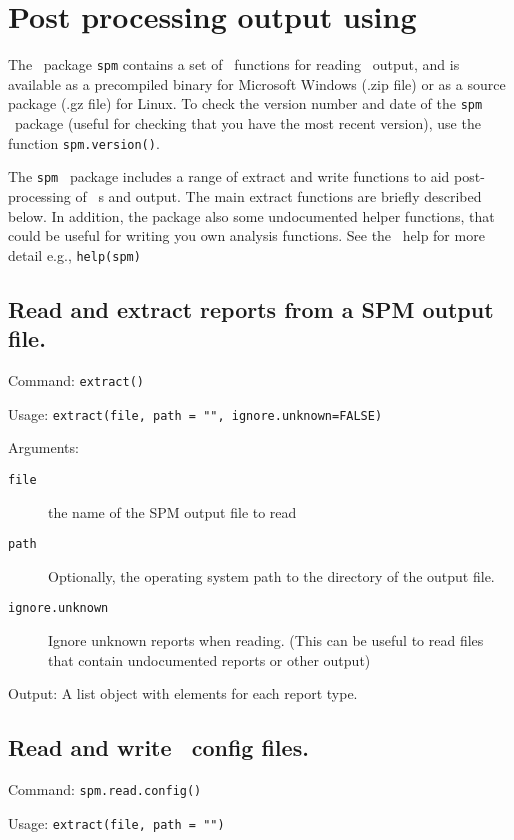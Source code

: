 \section{Post processing output using \R \label{sec:post-processing}}

The \R\ package \texttt{spm} contains a set of \R\ functions for reading \SPM\ output, and is available as a precompiled binary for Microsoft Windows (.zip file) or as a source package (.gz file) for Linux. To check the version number and date of the \texttt{spm} \R\ package (useful for checking that you have the most recent version), use the function \texttt{spm.version()}.

The \texttt{spm} \R\ package includes a range of extract and write functions to aid post-processing of \SPM\ \config s and output. The main extract functions are briefly described below. In addition, the package also some undocumented helper functions, that could be useful for writing you own analysis functions. See the \R\ help for more detail e.g., \texttt{help(spm)}

\subsection{Read and extract reports from a SPM output file.}

Command: \texttt{extract()} 

Usage: \texttt{extract(file, path = "", ignore.unknown=FALSE)}

Arguments:
\begin{description}
\item[\texttt{file}] the name of the SPM output file to read
\item[\texttt{path}] Optionally, the operating system path to the directory of the output file.
\item[\texttt{ignore.unknown}] Ignore unknown reports when reading. (This can be useful to read files that contain undocumented reports or other output)
\end{description}

Output: A list object with elements for each report type.

\subsection{Read and write \SPM\  config files.}

Command: \texttt{spm.read.config()} 

Usage: \texttt{extract(file, path = "")}

